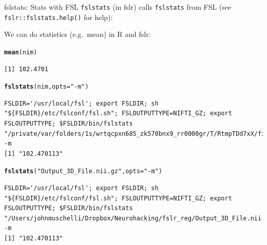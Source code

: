 \documentclass[11pt]{beamer}\usepackage[]{graphicx}\usepackage[]{color}
\makeatletter
\newcommand{\hlstr}[1]{\textcolor[rgb]{0.192,0.494,0.8}{#1}}%
\newcommand{\hlstd}[1]{\textcolor[rgb]{0.345,0.345,0.345}{#1}}%
\newcommand{\hlkwc}[1]{\textcolor[rgb]{0.333,0.667,0.333}{#1}}%
\newcommand{\hlkwd}[1]{\textcolor[rgb]{0.737,0.353,0.396}{\textbf{#1}}}%
\newenvironment{kframe}{%
 \def\at@end@of@kframe{}%
 \ifinner\ifhmode%
  \def\at@end@of@kframe{\end{minipage}}%
  \begin{minipage}{\columnwidth}%
 \fi\fi%
 \def\FrameCommand##1{\hskip\@totalleftmargin \hskip-\fboxsep
 \colorbox{shadecolor}{##1}\hskip-\fboxsep
     \hskip-\linewidth \hskip-\@totalleftmargin \hskip\columnwidth}%
 \MakeFramed {\advance\hsize-\width
   \@totalleftmargin\z@ \linewidth\hsize
   \@setminipage}}%
 {\par\unskip\endMakeFramed%
 \at@end@of@kframe}
\newenvironment{knitrout}{}{} %
\makeatother
\begin{document}
\begin{frame}[fragile]{fslstats: Stats with FSL}
\verb|fslstats| (in fslr) calls \verb|fslstats| from FSL (see \verb|fslr::fslstats.help()| for help):

We can do statistics (e.g.~mean) in R and fslr:
\begin{knitrout}
\color{fgcolor}\begin{kframe}
\begin{alltt}
\hlkwd{mean}\hlstd{(nim)}
\end{alltt}
\begin{verbatim}
[1] 102.4701
\end{verbatim}
\begin{alltt}
\hlkwd{fslstats}\hlstd{(nim,} \hlkwc{opts}\hlstd{=}\hlstr{"-m"}\hlstd{)}
\end{alltt}
\begin{verbatim}
FSLDIR='/usr/local/fsl'; export FSLDIR; sh "${FSLDIR}/etc/fslconf/fsl.sh"; FSLOUTPUTTYPE=NIFTI_GZ; export FSLOUTPUTTYPE; $FSLDIR/bin/fslstats "/private/var/folders/1s/wrtqcpxn685_zk570bnx9_rr0000gr/T/RtmpTDd7xX/file15a1c2da914a5.nii.gz" -m 
[1] "102.470113"
\end{verbatim}
\begin{alltt}
\hlkwd{fslstats}\hlstd{(}\hlstr{"Output_3D_File.nii.gz"}\hlstd{,} \hlkwc{opts} \hlstd{=} \hlstr{"-m"}\hlstd{)}
\end{alltt}
\begin{verbatim}
FSLDIR='/usr/local/fsl'; export FSLDIR; sh "${FSLDIR}/etc/fslconf/fsl.sh"; FSLOUTPUTTYPE=NIFTI_GZ; export FSLOUTPUTTYPE; $FSLDIR/bin/fslstats "/Users/johnmuschelli/Dropbox/Neurohacking/fslr_reg/Output_3D_File.nii.gz" -m 
[1] "102.470113"
\end{verbatim}
\end{kframe}
\end{knitrout}


\end{frame}
\end{document}
